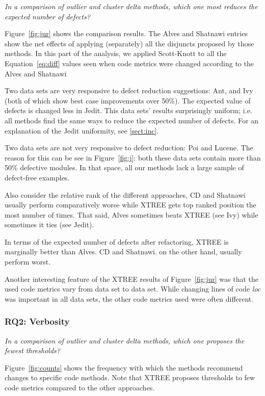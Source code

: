\documentclass{sig-alternate}
\newcommand{\tion}[1]{\textsection\ref{sect:#1}}
\newcommand{\fig}[1]{Figure~\ref{fig:#1}}
\newcommand{\eq}[1]{Equation~\ref{eq:#1}}
\theoremstyle{break}
\begin{document}
\begin{itemize}
{\em In a comparison of   outlier and cluster delta
methods, which one most reduces the expected number
of defects?}

\fig{jur} shows the comparison results.  The Alves and Shatnawi
entries show the net effects of applying (separately) all the disjuncts
proposed by those methods. In this part of the  analysis,
we applied Scott-Knott to all the \eq{diff} values
seen when code metrics were changed
according to the  Alves and Shatnawi
 

Two data sets are very responsive to defect reduction suggestions:
 Ant, and Ivy (both of which show best case improvements over 50\%).
 The  expected value of defects  
 is changed less in Jedit. This data sets' results
 surprisingly uniform; i.e.   all methods
 find the same ways to reduce the expected number of
defects.   For an explanation of the Jedit uniformity, see \tion{inc}.

Two data sets are not very responsive to defect reduction:
Poi and Lucene. The reason for this can be see in \fig{j}:
both these data sets contain more than 50\% defective modules.
In that space, all our  methods lack a large sample of
defect-free examples. 

Also consider the relative
rank of the different approaches,
 CD and Shatnawi usually  perform comparatively worse while  XTREE gets top ranked position the most
number of times. That said, Alves sometimes beats XTREE (see Ivy)
while sometimes it ties (see Jedit).

\begin{lesson}
In terms of the expected number of defects
  after refactoring,
XTREE is marginally better than Alves. CD and Shatnawi.
on the other hand, usually perform worst.
\end{lesson}

Another interesting feature of the XTREE results of
\fig{jur} was that the used code metrics vary
from data set to data set. While changing lines of
code {\em loc} was important in all data sets, 
the other code metrics used were often different.

 
 \subsubsection{RQ2: Verbosity}

{\em In a comparison of outlier and cluster delta methods, which one proposes the fewest thresholds?}

\fig{counts} shows the frequency with which the methods
recommend changes to specific code methods.
Note that XTREE proposes thresholds to
few code metrics compared to the other approaches. 


\end{itemize}
\end{document}
